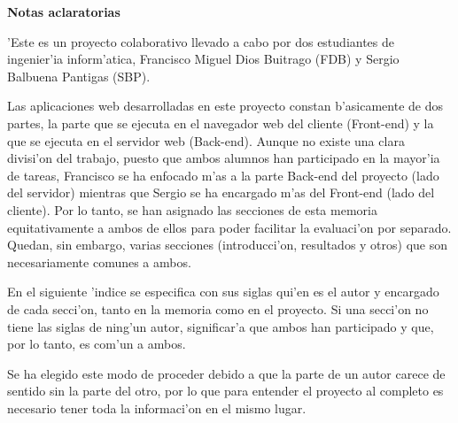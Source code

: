 \textbf{Notas aclaratorias}

'Este es un proyecto colaborativo llevado a cabo por dos estudiantes de ingenier'ia inform'atica, Francisco Miguel Dios Buitrago (FDB) y Sergio Balbuena Pantigas (SBP).

Las aplicaciones web desarrolladas en este proyecto constan b'asicamente de dos partes, la parte que se ejecuta en el navegador web del cliente (Front-end)
y la que se ejecuta en el servidor web (Back-end). Aunque no existe una clara divisi'on del trabajo, puesto que ambos alumnos han participado en la mayor'ia de tareas,
Francisco se ha enfocado m'as a la parte Back-end del proyecto (lado del servidor) mientras que Sergio se ha encargado m'as del Front-end (lado del cliente).
Por lo tanto, se han asignado las secciones de esta memoria equitativamente a ambos de ellos para poder facilitar la evaluaci'on por separado. Quedan,
sin embargo, varias secciones (introducci'on, resultados y otros) que son necesariamente comunes a ambos.

En el siguiente 'indice se especifica con sus siglas qui'en es el autor y encargado de cada secci'on, tanto en la memoria como en el proyecto. Si una secci'on no
tiene las siglas de ning'un autor, significar'a que ambos han participado y que, por lo tanto, es com'un a ambos.

Se ha elegido este modo de proceder debido a que la parte de un autor carece de sentido sin la parte del otro, por lo que para entender el proyecto
al completo es necesario tener toda la informaci'on en el mismo lugar.